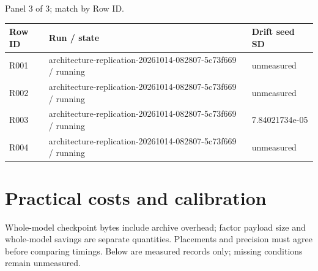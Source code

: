 \documentclass[10pt]{article}
\begin{document}
\par\noindent Panel 3 of 3; match by Row ID.
{\scriptsize\setlength{\tabcolsep}{2pt}
\begin{longtable}{p{}p{}p{}}
Row ID & Run / state & Drift seed SD \\
\hline\endhead
R001 & architecture-replication-20261014-082807-5c73f669 / running & unmeasured \\
R002 & architecture-replication-20261014-082807-5c73f669 / running & unmeasured \\
R003 & architecture-replication-20261014-082807-5c73f669 / running & 7.84021734e-05 \\
R004 & architecture-replication-20261014-082807-5c73f669 / running & unmeasured \\
\end{longtable}}

\section{Practical costs and calibration}

Whole-model checkpoint bytes include archive overhead; factor payload size and whole-model savings are separate quantities. Placements and precision must agree before comparing timings. Below are measured records only; missing conditions remain unmeasured.
\end{document}
